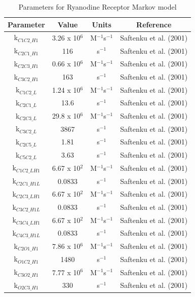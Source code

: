 \documentclass[12pt]{ucsddissertation}
\begin{document}
\begin{table}[h]
\centering
\caption{Parameters for Ryanodine Receptor Markov model}
\begin{tabular}{cccc}
\hline
\textbf{Parameter} & \textbf{Value} & \textbf{Units} & \textbf{
Reference} \\
\hline
k$_{C1C2\_H1}$ & 3.26 x 10$^{6}$ & M$^{-1}$s$^{-1}$ & 
Saftenku et al. (2001) \\
\hline
k$_{C2C1\_H1}$ & 116 & s$^{-1}$ & Saftenku et al. (2001) \\
\hline
k$_{C2C3\_H1}$ & 0.66 x 10$^{6}$ & M$^{-1}$s$^{-1}$ & 
Saftenku et al. (2001) \\
\hline
k$_{C3C2\_H1}$ & 163 & s$^{-1}$ & Saftenku et al. (2001) \\
\hline
k$_{C1C2\_L}$ & 1.24 x 10$^{6}$ & M$^{-1}$s$^{-1}$ & 
Saftenku et al. (2001) \\
\hline
k$_{C2C1\_L}$ & 13.6 & s$^{-1}$ & Saftenku et al. (2001) \\
\hline
k$_{C2C3\_L}$ & 29.8 x 10$^{6}$ & M$^{-1}$s$^{-1}$ & 
Saftenku et al. (2001) \\
\hline
k$_{C3C2\_L}$ & 3867 & s$^{-1}$ & Saftenku et al. (2001) \\
\hline
k$_{C2C5\_L}$ & 1.81 & s$^{-1}$ & Saftenku et al. (2001) \\
\hline
k$_{C5C2\_L}$ & 3.63 & s$^{-1}$ & Saftenku et al. (2001) \\
\hline
k$_{C1C2\_LH1}$ & 6.67 x 10$^{2}$ & M$^{-1}$s$^{-1}$ & 
Saftenku et al. (2001) \\
\hline
k$_{C2C1\_H1L}$ & 0.0833 & s$^{-1}$ & Saftenku et al. (2001) \\
\hline
k$_{C2C3\_LH1}$ & 6.67 x 10$^{2}$ & M$^{-1}$s$^{-1}$ & 
Saftenku et al. (2001) \\
\hline
k$_{C3C2\_H1L}$ & 0.0833 & s$^{-1}$ & Saftenku et al. (2001) \\
\hline
k$_{C3C4\_LH1}$ & 6.67 x 10$^{2}$ & M$^{-1}$s$^{-1}$ & 
Saftenku et al. (2001) \\
\hline
k$_{C4C3\_H1L}$ & 0.0833 & s$^{-1}$ & Saftenku et al. (2001) \\
\hline
k$_{C2O1\_H1}$ & 7.86 x 10$^{6}$ & M$^{-1}$s$^{-1}$ & 
Saftenku et al. (2001) \\
\hline
k$_{O1C2\_H1}$ & 1480 & s$^{-1}$ & Saftenku et al. (2001) \\
\hline
k$_{C3O2\_H1}$ & 7.77 x 10$^{6}$ & M$^{-1}$s$^{-1}$ & 
Saftenku et al. (2001) \\
\hline
k$_{O2C3\_H1}$ & 330 & s$^{-1}$ & Saftenku et al. (2001) \\

\end{tabular}
\end{table}
\end{document}
